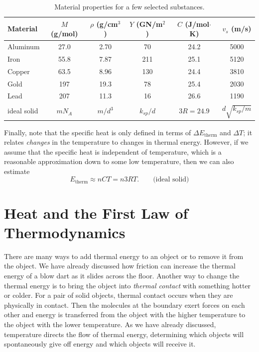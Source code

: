 \begin{table}
\begin{tabular}{lccccc}
\hline\hline
Material & $M$ (g/mol) & $\rho$ (g/cm$^3$) & $Y$ (GN/m$^2$) & 
$C$ (J/mol$\cdot$K)  & $v_s$ (m/s) \\ \hline
Aluminum & 27.0 & 2.70 & 70  & 24.2  & 5000\\
Iron     & 55.8 & 7.87 & 211 & 25.1  & 5120\\
Copper   & 63.5 & 8.96 & 130 & 24.4  & 3810\\
Gold     & 197  & 19.3 & 78  & 25.4  & 2030\\
Lead     & 207  & 11.3 & 16  & 26.6  & 1190\\
ideal solid & $mN_A$ & $m/d^3$ & $k_{ sp}/d$ & $3R = 24.9$  
                                          &  $d\sqrt{k_{ sp}/m}$\\
\hline\hline
\end{tabular}

\caption{Material properties for a few selected substances.}
\label{table:material_properties}
\end{table}

Finally, note that the specific heat is only defined in terms of
$\Delta E_\text{therm}$ and $\Delta T$; it relates \textit{changes} in
the temperature to changes in thermal energy.  However, if we assume
that the specific heat is independent of temperature, which is a
reasonable approximation down to some low temperature, then we can
also estimate
\begin{equation}
E_\text{therm} \approx nCT = n3RT. \qquad\text{(ideal solid)}
\end{equation}


\section{Heat and the First Law of Thermodynamics}
\label{sec:heat}

There are many ways to add thermal energy to an object or to remove it
from the object.  We have already discussed how friction can increase
the thermal energy of a blow dart as it slides across the floor.
Another way to change the thermal energy is to bring the object into
\textit{thermal contact} with something hotter or colder.  For a pair of
solid objects, thermal contact occurs when they are physically in
contact.  Then the molecules at the boundary exert forces on each
other and energy is transferred from the object with the higher
temperature to the object with the lower temperature.  
As we have already discussed,  temperature directs the flow of
thermal energy, determining which objects will spontaneously give off
energy and which objects will receive it.

